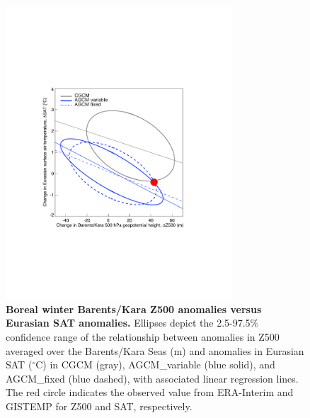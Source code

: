 \documentclass{nature}
\begin{document}
\begin{figure}%
\centering
\noindent\includegraphics[width=20pc]{Word/Figure_4.pdf}
\caption{\textbf{Boreal winter Barents/Kara Z500 anomalies versus Eurasian SAT anomalies.} Ellipses depict the 2.5-97.5\% confidence range of the relationship between anomalies in Z500 averaged over the Barents/Kara Seas (m) and anomalies in Eurasian SAT ($^\circ$C) in CGCM (gray), AGCM\_variable (blue solid), and AGCM\_fixed (blue dashed), with associated linear regression lines. The red circle indicates the observed value from ERA-Interim and GISTEMP for Z500 and SAT, respectively. 
} %
\label{fig:fig4} 
\end{figure}
\end{document}
